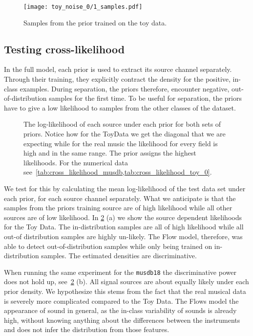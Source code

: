 \begin{figure}
    \texttt{[image: toy\_noise\_0/1\_samples.pdf]}%
    \label{fig:toy_time_sample}%
    \caption{Samples from the prior trained on the toy data.}
\end{figure}

\subsection{Testing cross-likelihood}
In the full model, each prior is used to extract its source channel separately. Through their training, they explicitly contract the density for the positive, in-class examples. During separation, the priors therefore, encounter negative, out-of-distribution samples for the first time. To be useful for separation, the priors have to give a low likelihood to samples from the other classes of the dataset.

\begin{figure}
    \centering
    \caption{The log-likelihood of each source under each prior for both sets of priors. Notice how for the ToyData we get the diagonal that we are expecting while for the real music the likelihood for every field is high and in the same range. The  prior assigns the highest likelihoods. For the numerical data see~\cref{tab:cross_likelihood_musdb,tab:cross_likelihood_toy_0}.}%
    \label{fig:noiseless_channels}%
\end{figure}

We test for this by calculating the mean log-likelihood of the test data set under each prior, for each source channel separately. What we anticipate is that the samples from the priors training source are of high likelihood while all other sources are of low likelihood. In \cref{fig:noiseless_channels} (a) we show the source dependent likelihoods for the Toy Data. The in-distribution samples are all of high likelihood while all out-of distribution samples are highly un-likely. The Flow model, therefore, was able to detect out-of-distribution samples while only being trained on in-distribution samples. The estimated densities are discriminative.

When running the same experiment for the \texttt{musdb18} the discriminative power does not hold up, see~\cref{fig:noiseless_channels} (b). All signal sources are about equally likely under each prior density. We hypothesize this stems from the fact that the real musical data is severely more complicated compared to the Toy Data. The Flows model the appearance of sound in general, as the in-class variability of sounds is already high, without knowing anything about the  differences between the instruments and does not infer the distribution from those features.

